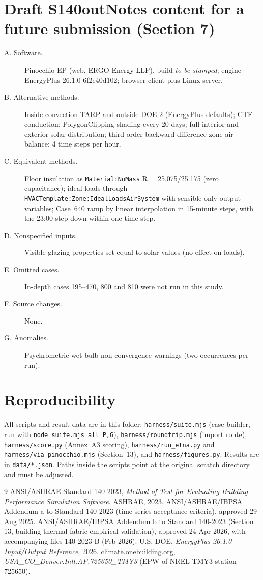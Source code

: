 \documentclass[10pt,a4paper]{article}
\newcommand{\code}[1]{\texttt{\small #1}}
\begin{document}
\appendix
\section{Draft S140outNotes content for a future submission (Section 7)}
\begin{description}
\item[A. Software.] Pinocchio-EP (web, ERGO Energy LLP), build \emph{to be stamped}; engine EnergyPlus 26.1.0-6f2e40d102;
browser client plus Linux server.
\item[B. Alternative methods.] Inside convection TARP and outside DOE-2 (EnergyPlus defaults); CTF conduction;
PolygonClipping shading every 20 days; full interior and exterior solar distribution; third-order backward-difference
zone air balance; 4 time steps per hour.
\item[C. Equivalent methods.] Floor insulation as \code{Material:NoMass} R = 25.075/25.175 (zero capacitance);
ideal loads through \code{HVACTemplate:Zone:IdealLoadsAirSystem} with sensible-only output variables; Case~640
ramp by linear interpolation in 15-minute steps, with the 23:00 step-down within one time step.
\item[D. Nonspecified inputs.] Visible glazing properties set equal to solar values (no effect on loads).
\item[E. Omitted cases.] In-depth cases 195--470, 800 and 810 were not run in this study.
\item[F. Source changes.] None.
\item[G. Anomalies.] Psychrometric wet-bulb non-convergence warnings (two occurrences per run).
\end{description}

\section{Reproducibility}
All scripts and result data are in this folder: \code{harness/suite.mjs} (case builder, run with
\code{node suite.mjs all P,G}), \code{harness/roundtrip.mjs} (import route), \code{harness/score.py} (Annex~A3
scoring), \code{harness/run\_etna.py} and \code{harness/via\_pinocchio.mjs} (Section~13), and
\code{harness/figures.py}. Results are in \code{data/*.json}. Paths inside the scripts point at the original
scratch directory and must be adjusted.

\begin{thebibliography}{9}\small
{} ANSI/ASHRAE Standard 140-2023, \emph{Method of Test for Evaluating Building Performance Simulation Software}. ASHRAE, 2023.
 ANSI/ASHRAE/IBPSA Addendum a to Standard 140-2023 (time-series acceptance criteria), approved 29 Aug 2025.
 ANSI/ASHRAE/IBPSA Addendum b to Standard 140-2023 (Section 13, building thermal fabric empirical validation), approved 24 Apr 2026, with accompanying files 140-2023-B (Feb 2026).
 U.S. DOE, \emph{EnergyPlus 26.1.0 Input/Output Reference}, 2026.
 climate.onebuilding.org, \emph{USA\_CO\_Denver.Intl.AP.725650\_TMY3} (EPW of NREL TMY3 station 725650).
\end{thebibliography}
\end{document}
